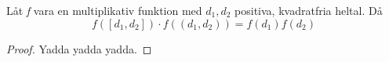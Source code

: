 \begin{lemma}\label{APDX:multFunk}
Låt \textit{f} vara en multiplikativ funktion med \(d_1,d_2\) positiva, kvadratfria heltal. Då
\begin{equation}
    f([d_1,d_2])\cdot f((d_1, d_2)) = f(d_1)f(d_2)\nonumber
\end{equation}
\end{lemma}
\begin{proof}
Yadda yadda yadda.
\end{proof}